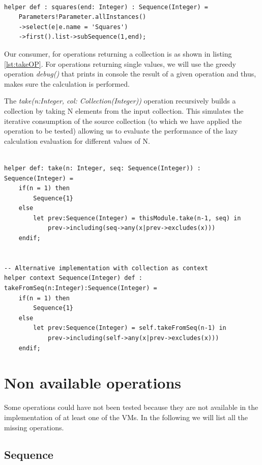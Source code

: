 \begin{lstlisting}[language=ATL, style=AMMA,
label=lst:SquaresOP, caption=Squares() operation]
 
helper def : squares(end: Integer) : Sequence(Integer) =
	Parameters!Parameter.allInstances()
	->select(e|e.name = 'Squares')
	->first().list->subSequence(1,end);

\end{lstlisting}

Our consumer, for operations returning a collection is as shown in listing
\ref{lst:takeOP}. For operations returning single values, we will use the greedy
operation \emph{debug()} that prints in console the result of a given operation
and thus, makes sure the calculation is performed.

The \emph{take(n:Integer, col: Collection(Integer))} operation recursively
builds a collection by taking N elements from the input collection. This
simulates the iterative consumption of the source collection (to which we have
applied the operation to be tested) allowing us to evaluate the performance of
the lazy calculation evaluation for different values of N.

\begin{lstlisting}[language=ATL, style=AMMA,
label=lst:takeOP, caption=take() operation] 

helper def: take(n: Integer, seq: Sequence(Integer)) : Sequence(Integer) = 
	if(n = 1) then
		Sequence{1}
	else
		let prev:Sequence(Integer) = thisModule.take(n-1, seq) in
			prev->including(seq->any(x|prev->excludes(x)))
	endif;


-- Alternative implementation with collection as context
helper context Sequence(Integer) def : takeFromSeq(n:Integer):Sequence(Integer) = 
	if(n = 1) then
		Sequence{1}
	else
		let prev:Sequence(Integer) = self.takeFromSeq(n-1) in
			prev->including(self->any(x|prev->excludes(x)))
	endif;

\end{lstlisting}

\section{Non available operations}

Some operations could have not been tested because they are not available in the
implementation of at least one of the VMs. In the following we will list all the
missing operations.

\subsection{Sequence}


